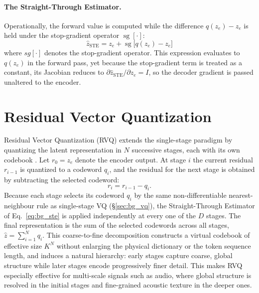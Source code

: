 \documentclass[12pt]{report}
\begin{document}
\paragraph{The Straight-Through Estimator.}
 Operationally, the forward value is computed while the difference $q(z_e) - z_e$ is held under the stop-gradient operator $\operatorname{sg}[\cdot]$:
\begin{equation}
    \label{eq:bg_ste}
    \hat{z}_{\text{STE}} = z_e + \operatorname{sg}\big[q(z_e) - z_e\big]
\end{equation}
where $sg[\cdot]$ denotes the stop-gradient operator. This expression evaluates to $q(z_e)$ in the forward pass, yet because the stop-gradient term is treated as a constant, its Jacobian reduces to $\partial \hat{z}_{\text{STE}} / \partial z_e = I$, so the decoder gradient is passed unaltered to the encoder.

\section{Residual Vector Quantization}
\label{sec:bg_rvq}
Residual Vector Quantization (RVQ) extends the single-stage paradigm by quantizing the latent representation in $N$ successive stages, each with its own codebook \cite{soundstream}. Let $r_0 = z_e$ denote the encoder output. At stage $i$ the current residual $r_{i-1}$ is quantized to a codeword $q_i$, and the residual for the next stage is obtained by subtracting the selected codeword:
\begin{equation}
    \label{eq:bg_rvq_residual}
    r_i = r_{i-1} - q_i.
\end{equation}
Because each stage selects its codeword $q_i$ by the same non-differentiable nearest-neighbour rule as single-stage VQ (\S\ref{sec:bg_vq}), the Straight-Through Estimator of Eq.~\ref{eq:bg_ste} is applied independently at every one of the $D$ stages. The final representation is the sum of the selected codewords across all stages, $\hat{z} = \sum_{i=1}^{N} q_i$. This coarse-to-fine decomposition constructs a virtual codebook of effective size $K^N$ without enlarging the physical dictionary or the token sequence length, and induces a natural hierarchy: early stages capture coarse, global structure while later stages encode progressively finer detail. This makes RVQ especially effective for multi-scale signals such as audio, where global structure is resolved in the initial stages and fine-grained acoustic texture in the deeper ones. 
\end{document}
